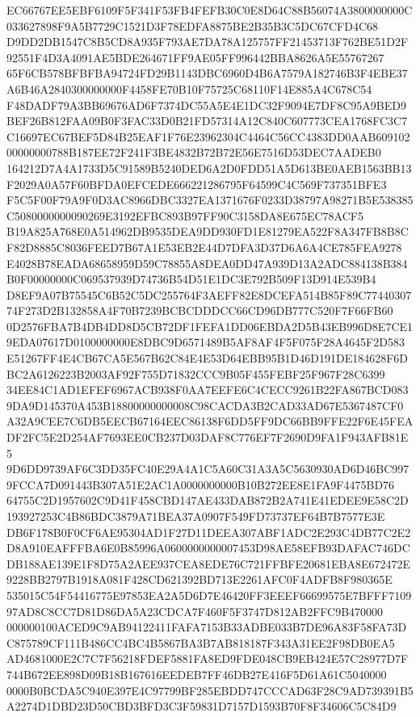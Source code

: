 \documentclass[UTF8,fontset=fandol,zihao=-4,a4paper]{ctexart}
\begin{document}
{{EC66767EE5EBF6109F5F341F53FB4FEFB30C0E8D64C88B56074A3800000000C033627898F9A5B7729C1521D3F78EDFA8875BE2B35B3C5DC67CFD4C68
D9DD2DB1547C8B5CD8A935F793AE7DA78A125757FF21453713F762BE51D2F92551F4D3A4091AE5BDE264671FF9AE05FF996442BBA8626A5E55767267
65F6CB578BFBFBA94724FD29B1143DBC6960D4B6A7579A182746B3F4EBE37A6B46A2840300000000F4458FE70B10F75725C68110F14E885A4C678C54
F48DADF79A3BB69676AD6F7374DC55A5E4E1DC32F9094E7DF8C95A9BED9BEF26B812FAA09B0F3FAC33D0B21FD57314A12C840C607773CEA1768FC3C7
C16697EC67BEF5D84B25EAF1F76E23962304C4464C56CC4383DD0AAB60910200000000788B187EE72F241F3BE4832B72B72E56E7516D53DEC7AADEB0
164212D7A4A1733D5C91589B5240DED6A2D0FDD51A5D613BE0AEB1563BB13F2029A0A57F60BFDA0EFCEDE666221286795F64599C4C569F737351BFE3
F5C5F00F79A9F0D3AC8966DBC3327EA1371676F0233D38797A98271B5E538385C5080000000090269E3192EFBC893B97FF90C3158DA8E675EC78ACF5
B19A825A768E0A514962DB9535DEA9DD930FD1E81279EA522F8A347FB8B8CF82D8885C8036FEED7B67A1E53EB2E44D7DFA3D37D6A6A4CE785FEA9278
E4028B78EADA68658959D59C78855A8DEA0DD47A939D13A2ADC884138B384B0F00000000C069537939D74736B54D51E1DC3E792B509F13D914E539B4
D8EF9A07B75545C6B52C5DC255764F3AEFF82E8DCEFA514B85F89C7744030774F273D2B132858A4F70B7239BCBCDDDCC66CD96DB777C520F7F66FB60
0D2576FBA7B4DB4DD8D5CB72DF1FEFA1DD06EBDA2D5B43EB996D8E7CE19EDA07617D0100000000E8DBC9D6571489B5AF8AF4F5F075F28A4645F2D583
E51267FF4E4CB67CA5E567B62C84E4E53D64EBB95B1D46D191DE184628F6DBC2A6126223B2003AF92F755D71832CCC9B05F455FEBF25F967F28C6399
34EE84C1AD1EFEF6967ACB938F0AA7EEFE6C4CECC9261B22FA867BCD0839DA9D145370A453B18800000000008C98CACDA3B2CAD33AD67E5367487CF0
A32A9CEE7C6DB5EECB67164EEC86138F6DD5FF9DC66BB9FFE22F6E45FEADF2FC5E2D254AF7693EE0CB237D03DAF8C776EF7F2690D9FA1F943AFB81E5
9D6DD9739AF6C3DD35FC40E29A4A1C5A60C31A3A5C5630930AD6D46BC9979FCCA7D091443B307A51E2AC1A0000000000B10B272EE8E1FA9F4475BD76
64755C2D1957602C9D41F458CBD147AE433DAB872B2A741E41EDEE9E58C2D193927253C4B86BDC3879A71BEA37A0907F549FD73737EF64B7B7577E3E
DB6F178B0F0CF6AE95304AD1F27D11DEEA307ABF1ADC2E293C4DB77C2E2D8A910EAFFFBA6E0B85996A0600000000007453D98AE58EFB93DAFAC746DC
DB188AE139E1F8D75A2AEE937CEA8EDE76C721FFBFE20681EBA8E672472E9228BB2797B1918A081F428CD621392BD713E2261AFC0F4ADFB8F980365E
535015C54F54416775E97853EA2A5D6D7E46420FF3EEEF66699575E7BFFF710997AD8C8CC7D81D86DA5A23CDCA7F460F5F3747D812AB2FFC9B470000
000000100ACED9C9AB94122411FAFA7153B33ADBE033B7DE96A83F58FA73DC875789CF111B486CC4BC4B5867BA3B7AB818187F343A31EE2F98DB0EA5
AD4681000E2C7C7F56218FDEF5881FA8ED9FDE048CB9EB424E57C28977D7F744B672EE898D09B18B167616EEDEB7FF46DB27E416F5D61A61C5040000
0000B0BCDA5C940E397E4C97799BF285EBDD747CCCAD63F28C9AD739391B5A2274D1DBD23D50CBD3BFD3C3F59831D7157D1593B70F8F34606C5C84D9
}}
\end{document}
